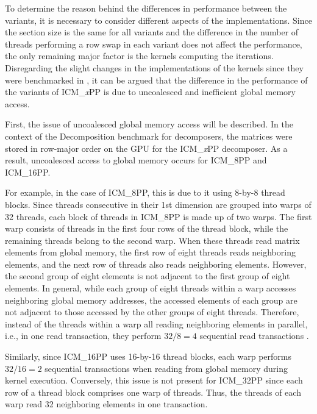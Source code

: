 To determine the reason behind the differences in performance between the variants, it is necessary to consider different aspects of the implementations. Since the section size is the same for all variants and the difference in the number of threads performing a row swap in each variant does not affect the performance, the only remaining major factor is the kernels computing the iterations.\\
Disregarding the slight changes in the implementations of the kernels since they were benchmarked in  \cite{Cejka2022}, it can be argued that the difference in the performance of the variants of ICM\_\textit{x}PP is due to uncoalesced and inefficient global memory access.

First, the issue of uncoalesced global memory access will be described. In the context of the Decomposition benchmark for decomposers, the matrices were stored in row-major order on the GPU for the ICM\_\textit{x}PP decomposer.
As a result, uncoalesced access to global memory occurs for ICM\_8PP and ICM\_16PP.

For example, in the case of ICM\_8PP, this is due to it using 8-by-8 thread blocks. Since threads consecutive in their 1st dimension are grouped into warps of 32 threads, each block of threads in ICM\_8PP is made up of two warps. The first warp consists of threads in the first four rows of the thread block, while the remaining threads belong to the second warp. When these threads read matrix elements from global memory, the first row of eight threads reads neighboring elements, and the next row of threads also reads neighboring elements. However, the second group of eight elements is not adjacent to the first group of eight elements. In general, while each group of eight threads within a warp accesses neighboring global memory addresses, the accessed elements of each group are not adjacent to those accessed by the other groups of eight threads. Therefore, instead of the threads within a warp all reading neighboring elements in parallel, i.e., in one read transaction, they perform $32/8 = 4$ sequential read transactions \cite{Cejka2022}.

Similarly, since ICM\_16PP uses 16-by-16 thread blocks, each warp performs $32/16 = 2$ sequential transactions when reading from global memory during kernel execution. Conversely, this issue is not present for ICM\_32PP since each row of a thread block comprises one warp of threads. Thus, the threads of each warp read 32 neighboring elements in one transaction.

